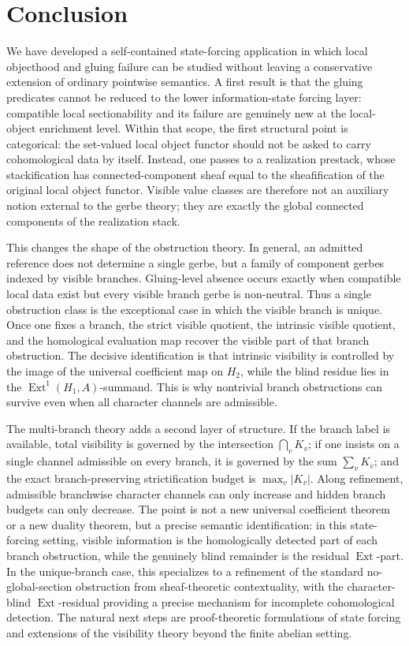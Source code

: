 \section{Conclusion}\label{sec:conclusion}

We have developed a self-contained state-forcing application in which local objecthood and gluing failure can be studied without leaving a conservative extension of ordinary pointwise semantics. A first result is that the gluing predicates cannot be reduced to the lower information-state forcing layer: compatible local sectionability and its failure are genuinely new at the local-object enrichment level. Within that scope, the first structural point is categorical: the set-valued local object functor should not be asked to carry cohomological data by itself. Instead, one passes to a realization prestack, whose stackification has connected-component sheaf equal to the sheafification of the original local object functor. Visible value classes are therefore not an auxiliary notion external to the gerbe theory; they are exactly the global connected components of the realization stack.

This changes the shape of the obstruction theory. In general, an admitted reference does not determine a single gerbe, but a family of component gerbes indexed by visible branches. Gluing-level absence occurs exactly when compatible local data exist but every visible branch gerbe is non-neutral. Thus a single obstruction class is the exceptional case in which the visible branch is unique. Once one fixes a branch, the strict visible quotient, the intrinsic visible quotient, and the homological evaluation map recover the visible part of that branch obstruction. The decisive identification is that intrinsic visibility is controlled by the image of the universal coefficient map on $H_2$, while the blind residue lies in the $\operatorname{Ext}^1(H_1,A)$-summand. This is why nontrivial branch obstructions can survive even when all character channels are admissible.

The multi-branch theory adds a second layer of structure. If the branch label is available, total visibility is governed by the intersection $\bigcap_v K_v$; if one insists on a single channel admissible on every branch, it is governed by the sum $\sum_v K_v$; and the exact branch-preserving strictification budget is $\max_v |K_v|$. Along refinement, admissible branchwise character channels can only increase and hidden branch budgets can only decrease. The point is not a new universal coefficient theorem or a new duality theorem, but a precise semantic identification: in this state-forcing setting, visible information is the homologically detected part of each branch obstruction, while the genuinely blind remainder is the residual $\operatorname{Ext}$-part. In the unique-branch case, this specializes to a refinement of the standard no-global-section obstruction from sheaf-theoretic contextuality, with the character-blind $\operatorname{Ext}$-residual providing a precise mechanism for incomplete cohomological detection. The natural next steps are proof-theoretic formulations of state forcing and extensions of the visibility theory beyond the finite abelian setting.
